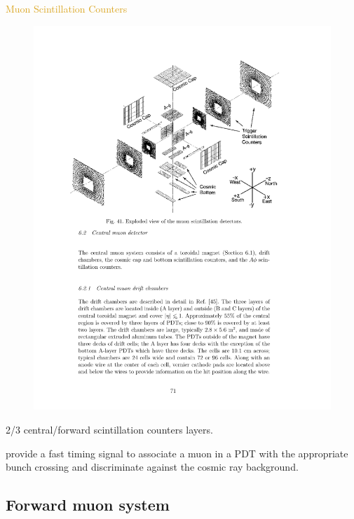 \begin{frame}{\textcolor{Goldenrod}{Muon Scintillation Counters}}
  \begin{overlayarea}{\textwidth}{\textheight}
    \begin{figure}[h]
      \centering
      \includegraphics[height=0.4\textheight]{./Images/44_MD_Sintillators}
    \end{figure}
    
    \itt

  \item
    2/3 central/forward scintillation counters layers.
    
  \item provide a fast timing signal to associate a muon in a PDT with the
    appropriate bunch crossing and discriminate against the cosmic ray
    background.
    \tti
  \end{overlayarea}
\end{frame}

\subsection{Forward muon system}

